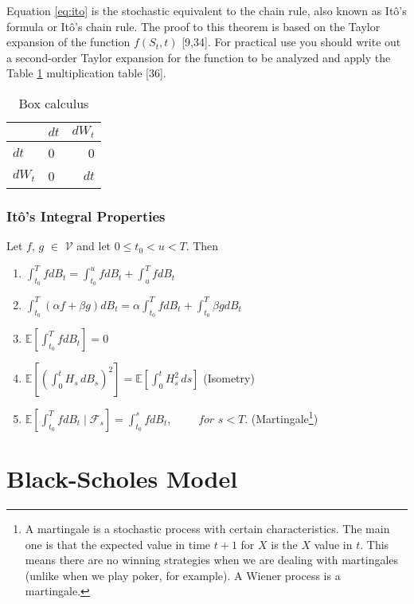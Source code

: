 \documentclass[12pt,twoside]{reedthesis}
\theoremstyle{definition}
\theoremstyle{definition}
\theoremstyle{remark}
\begin{document}
  Equation \eqref{eq:ito} is the stochastic equivalent to the chain rule,
  also known as Itô's formula or Itô's chain rule. The proof to this
  theorem is based on the Taylor expansion of the function \(f(S_t, t)\)
  {[}9,34{]}. For practical use you should write out a second-order Taylor
  expansion for the function to be analyzed and apply the Table
  \ref{tab:box-calc} multiplication table {[}36{]}.
  \begin{longtable}[t]{llr}
  \caption{\label{tab:box-calc}Box calculus}\\
  \toprule
    & $dt$ & $dW_t$\\
  \midrule
  $dt$ & 0 & 0\\
  $dW_t$ & 0 & $dt$\\
  \bottomrule
  \end{longtable}
  \subsubsection{Itô's Integral
  Properties}\label{itos-integral-properties}
  
  Let \(f\), \(g\) \(\in\) \(\mathcal{V}\) and let \(0 \leq t_0 < u < T\).
  Then
  \begin{enumerate}[label=(\roman*)]
    \item $\int_{t_0}^{T}{f dB_t} = \int_{t_0}^{u}{f dB_t} + \int_{u}^{T}{f dB_t}$
    \item $\int_{t_0}^{T}{(\alpha f + \beta g) dB_t} = \alpha  \int_{t_0}^{T}{f dB_t} + \int_{t_0}^{T}{ \beta g dB_t}$
    \item $\mathbb{E}\left[ \int_{t_0}^{T}{fdB_t}\right] = 0 $
    \item $\mathbb {E} \left[\left(\int_{0}^{t}H_{s}\,dB_{s}\right)^{2}\right]=\mathbb {E} \left[\int _{0}^{t}H_{s}^{2}\,ds\right]$ (Isometry)
    \item $ \mathbb {E}\left[ \int_{t_0}^{T}{f dB_t \mid \mathcal{F}_{s}} \right] = \int_{t_0}^{s}{f dB_t}, \,\,\,\,\,\,\,\,\,\,\,\,\,\, for \,\, s < T.$  (Martingale\footnote{A martingale is a stochastic process with certain characteristics. The main one is that the expected value in time $t+1$ for $X$ is the $X$ value in $t$. This means there are no winning strategies when we are dealing with martingales (unlike when we play poker, for example). A Wiener process is a martingale.})
  \end{enumerate}
  \section{Black-Scholes Model}\label{black-scholes-model}
  
\end{document}
